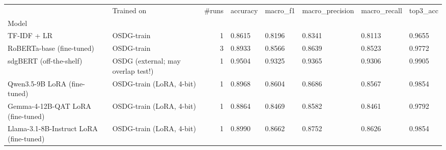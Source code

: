 \begin{tabular}{llrlllll}
\toprule
 & Trained on & #runs & accuracy & macro_f1 & macro_precision & macro_recall & top3_acc \\
Model &  &  &  &  &  &  &  \\
\midrule
TF-IDF + LR & OSDG-train & 1 & 0.8615 & 0.8196 & 0.8341 & 0.8113 & 0.9655 \\
RoBERTa-base (fine-tuned) & OSDG-train & 3 & 0.8933 & 0.8566 & 0.8639 & 0.8523 & 0.9772 \\
sdgBERT (off-the-shelf) & OSDG (external; may overlap test!) & 1 & 0.9504 & 0.9325 & 0.9365 & 0.9306 & 0.9905 \\
Qwen3.5-9B LoRA (fine-tuned) & OSDG-train (LoRA, 4-bit) & 1 & 0.8968 & 0.8604 & 0.8686 & 0.8567 & 0.9854 \\
Gemma-4-12B-QAT LoRA (fine-tuned) & OSDG-train (LoRA, 4-bit) & 1 & 0.8864 & 0.8469 & 0.8582 & 0.8461 & 0.9792 \\
Llama-3.1-8B-Instruct LoRA (fine-tuned) & OSDG-train (LoRA, 4-bit) & 1 & 0.8990 & 0.8662 & 0.8752 & 0.8626 & 0.9854 \\
\bottomrule
\end{tabular}
